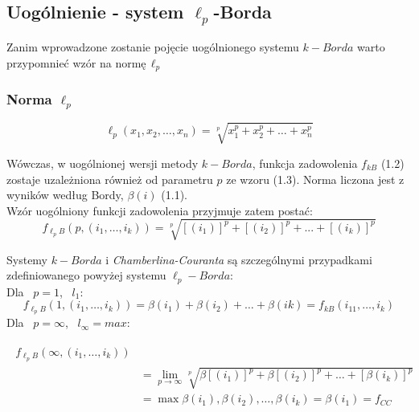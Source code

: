 \documentclass[pdflatex,11pt]{../aghdoc_version2}
\begin{document}
\subsection{Uogólnienie - system $\ell_p$-Borda}
\label{subsec:system_ell_p_borda}

Zanim wprowadzone zostanie pojęcie uogólnionego systemu $k-Borda$ warto przypomnieć wzór na normę\,$\ell_p$
\subsubsection{Norma $\ell_p$}
\label{subsubsection:norma_ell_p}
\begin{equation}
\ell_p(x_1,x_2,\dots, x_n) = \sqrt[p]{x_1^p+x_2^p+\dots+x_n^p}
\end{equation}


Wówczas, w uogólnionej wersji metody $k-Borda$, funkcja zadowolenia $f_{kB}$ (1.2) zostaje uzależniona również od parametru $p$ ze wzoru (1.3). Norma liczona jest z wyników według Bordy, $\beta(i)$ (1.1).\\Wzór uogólniony funkcji zadowolenia przyjmuje zatem postać:
\begin{equation}
f_{\ell_pB}(p,(i_1,\dots,i_k))=\sqrt[p]{[(i_1)]^p+[(i_2)]^p+...+[(i_k)]^p}
\end{equation}

Systemy $k-Borda$ i \textit{Chamberlina-Couranta} są szczególnymi przypadkami zdefiniowanego powyżej systemu $\ell_p-Borda$:\\
Dla \, $p = 1$, \, $l_1$:
\begin{equation}
f_{\ell_pB}(1,(i_1, \dots ,i_k)) = \beta(i_1) + \beta(i_2) + \dots + \beta(ik) = f_{kB}(i_11, \dots,i_k)
\end{equation}
Dla \, $p= \infty$, \, $l_{\infty}={max}$:

\begin{multline}
\begin{split}
f_{\ell_pB}(\infty,(i_1, \dots ,i_k))\\
&=\lim\limits_{p \to \infty} \sqrt[p]{\beta\left[(i_1)\right]^p+\beta\left[(i_2)\right]^p+ \dots +\left[\beta(i_k)\right]^p}\\
&=\max{\beta(i_1),\beta(i_2),\dots,\beta(i_k)} = \beta(i_1)=f_{CC}
\end{split}
\end{multline}
\end{document}
